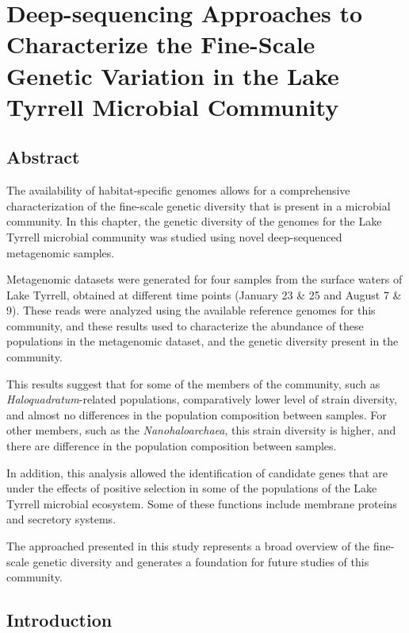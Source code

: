 \chapter{Deep-sequencing Approaches to Characterize the Fine-Scale Genetic Variation in the Lake Tyrrell Microbial Community}

\section{Abstract}

The availability of habitat-specific genomes allows for a comprehensive characterization of the fine-scale genetic diversity that is present in a microbial community. In this chapter, the genetic diversity of the genomes for the Lake Tyrrell microbial community was studied using novel deep-sequenced metagenomic samples.

Metagenomic datasets were generated for four samples from the surface waters of Lake Tyrrell, obtained at different time points (January 23 \& 25 and August 7 \& 9). These reads were analyzed using the available reference genomes for this community, and these results used to characterize the abundance of these populations in the metagenomic dataset, and the genetic diversity present in the community.

This results suggest that for some of the members of the community, such as \textit{Haloquadratum}-related populations, comparatively lower level of strain diversity, and almost no differences in the population composition between samples. For other members, such as the \textit{Nanohaloarchaea}, this strain diversity is higher, and there are difference in the population composition between samples.

In addition, this analysis allowed the identification of candidate genes that are under the effects of positive selection in some of the populations of the Lake Tyrrell microbial ecosystem. Some of these functions include membrane proteins and secretory systems.

The approached presented in this study represents a broad overview of the fine-scale genetic diversity and generates a foundation for future studies of this community.


\section{Introduction}

